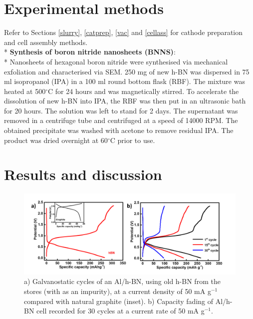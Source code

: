 \section{Experimental methods}
Refer to Sections \ref{slurry}, \ref{catprep}, \ref{vac} and \ref{cellass} for cathode preparation and cell assembly methods. \\*
\textbf{Synthesis of boron nitride nanosheets (BNNS)}: \\*
Nanosheets of hexagonal boron nitride were synthesised via mechanical exfoliation and characterised via SEM. 250 mg of new h-BN was dispersed in 75 ml isopropanol (IPA) in a 100 ml round bottom flask (RBF). The mixture was heated at 500$^{\circ}$C for 24 hours and was magnetically stirred. To accelerate the dissolution of new h-BN into IPA, the RBF was then put in an ultrasonic bath for 20 hours. The solution was left to stand for 2 days. The supernatant was removed in a centrifuge tube and centrifuged at a speed of 14000 RPM. The obtained precipitate was washed with acetone to remove residual IPA. The product was dried overnight at 60$^{\circ}$C prior to use. 

\section{Results and discussion}

\begin{figure}[tbh!]
\centering
\includegraphics[width=\textwidth]{Figures/BOhBN/hBNiniCDC}
\caption{a) Galvanostatic cycles of an Al/h-BN, using old h-BN from the stores (with  as an impurity), at a current density of 50 mA g$^{-1}$ compared with natural graphite (inset). b) Capacity fading of Al/h-BN cell recorded for 30 cycles at a current rate of 50 mA g$^{-1}$.}
\label{Figures/BOhBN:hBNiniCDC}
\end{figure}

